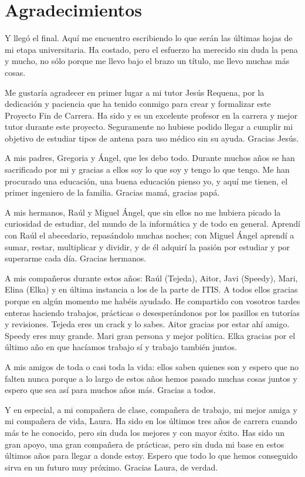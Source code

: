 \chapter*{\textbf{Agradecimientos}}

Y llegó el final. Aquí me encuentro escribiendo lo que serán las últimas hojas de mi etapa universitaria. Ha costado, pero el esfuerzo ha merecido sin duda la pena y mucho, no sólo porque me llevo bajo el brazo un título, me llevo muchas más cosas.

Me gustaría agradecer en primer lugar a mi tutor Jesús Requena, por la dedicación y paciencia que ha tenido conmigo para crear y formalizar este Proyecto Fin de Carrera. Ha sido y es un excelente profesor en la carrera y mejor tutor durante este proyecto. Seguramente no hubiese podido llegar a cumplir mi objetivo de estudiar tipos de antena para uso médico sin su ayuda. Gracias Jesús.

A mis padres, Gregoria y Ángel, que les debo todo. Durante muchos años se han sacrificado por mi y gracias a ellos soy lo que soy y tengo lo que tengo. Me han procurado una educación, una buena educación pienso yo, y aquí me tienen, el primer ingeniero de la familia. Gracias mamá, gracias papá.

A mis hermanos, Raúl y Miguel Ángel, que sin ellos no me hubiera picado la curiosidad de estudiar, del mundo de la informática y de todo en general. Aprendí con Raúl el abecedario, repasándolo muchas noches; con Miguel Ángel aprendí a sumar, restar, multiplicar y dividir, y de él adquirí la pasión por estudiar y por superarme cada día. Gracias hermanos.

A mis compañeros durante estos años: Raúl (Tejeda), Aitor, Javi (Speedy), Mari, Elina (Elka) y en última instancia a los de la parte de ITIS. A todos ellos gracias porque en algún momento me habéis ayudado. He compartido con vosotros tardes enteras haciendo trabajos, prácticas o desesperándonos por los pasillos en tutorías y revisiones. Tejeda eres un crack y lo sabes. Aitor gracias por estar ahí amigo. Speedy eres muy grande. Mari gran persona y mejor política. Elka gracias por el último año en que hacíamos trabajo sí y trabajo también juntos.

A mis amigos de toda o casi toda la vida: ellos saben quienes son y espero que no falten nunca porque a lo largo de estos años hemos pasado muchas cosas juntos y espero que sea así para muchos años más. Gracias a todos.

Y en especial, a mi compañera de clase, compañera de trabajo, mi mejor amiga y mi compañera de vida, Laura. Ha sido en los últimos tres años de carrera cuando más te he conocido, pero sin duda los mejores y con mayor éxito. Has sido un gran apoyo, una gran compañera de prácticas, pero sin duda mi base en estos últimos años para llegar a donde estoy. Espero que todo lo que hemos conseguido sirva en un futuro muy próximo. Gracias Laura, de verdad.
